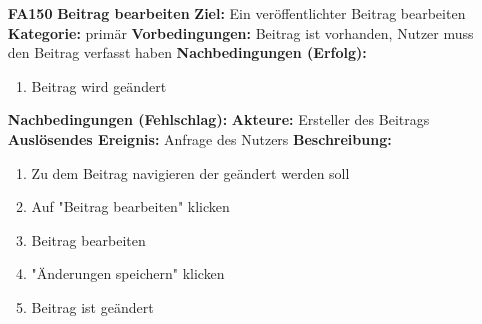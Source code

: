 \documentclass[parskip=full]{scrartcl}
\begin{document}
\begin{itemize}[nosep]
			\item[\textbf{FA150}]\textbf{Beitrag bearbeiten}
			\newline \textbf{Ziel:} Ein veröffentlichter Beitrag bearbeiten
			\newline \textbf{Kategorie:} primär
			\newline \textbf{Vorbedingungen:} Beitrag ist vorhanden, Nutzer muss den Beitrag verfasst haben
			\newline \textbf{Nachbedingungen (Erfolg):}
			\begin{enumerate}[nosep]
				\item Beitrag wird geändert
			\end{enumerate}
			\textbf{Nachbedingungen (Fehlschlag):}
			\newline \textbf{Akteure:} Ersteller des Beitrags
			\newline \textbf{Auslösendes Ereignis:} Anfrage des Nutzers
			\newline \textbf{Beschreibung:}
			\begin{enumerate}[nosep]
				\item Zu dem Beitrag navigieren der geändert werden soll
				\item Auf "Beitrag bearbeiten" klicken
				\item Beitrag bearbeiten
				\item "Änderungen speichern" klicken
				\item Beitrag ist geändert\\
			\end{enumerate}
			

\end{itemize}
\end{document}

